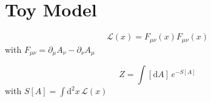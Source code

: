 \chapter{Toy Model}\label{ch:toy_model}

\[
    \mathcal L(x) = F_{\mu\nu}(x)F_{\mu\nu}(x)
\]
with $F_{\mu\nu} = \partial_\mu A_\nu - \partial_\nu A_\mu$

\[
    Z = \int [\mathrm{d}A]\, e^{-S[A]}
\]
with $S[A] = \int \mathrm{d}^2 x\, \mathcal L(x)$

